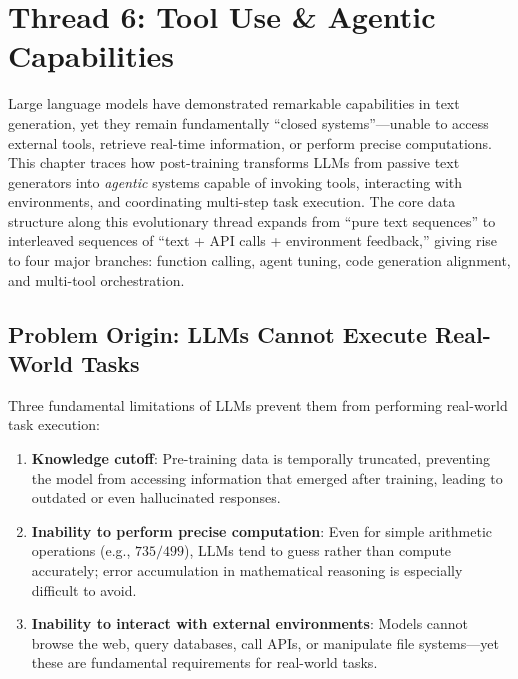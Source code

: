 
\section{Thread 6: Tool Use \& Agentic Capabilities}
\label{sec:t6}

Large language models have demonstrated remarkable capabilities in text generation, yet they remain fundamentally ``closed systems''---unable to access external tools, retrieve real-time information, or perform precise computations. This chapter traces how post-training transforms LLMs from passive text generators into \emph{agentic} systems capable of invoking tools, interacting with environments, and coordinating multi-step task execution. The core data structure along this evolutionary thread expands from ``pure text sequences'' to interleaved sequences of ``text + API calls + environment feedback,'' giving rise to four major branches: function calling, agent tuning, code generation alignment, and multi-tool orchestration.



\subsection{Problem Origin: LLMs Cannot Execute Real-World Tasks}
\label{sec:t6-origin}

\begin{problembox}
Three fundamental limitations of LLMs prevent them from performing real-world task execution:
\begin{enumerate}[leftmargin=*]
  \item \textbf{Knowledge cutoff}: Pre-training data is temporally truncated, preventing the model from accessing information that emerged after training, leading to outdated or even hallucinated responses.
  \item \textbf{Inability to perform precise computation}: Even for simple arithmetic operations (e.g., $735/499$), LLMs tend to guess rather than compute accurately; error accumulation in mathematical reasoning is especially difficult to avoid.
  \item \textbf{Inability to interact with external environments}: Models cannot browse the web, query databases, call APIs, or manipulate file systems---yet these are fundamental requirements for real-world tasks.
\end{enumerate}
\end{problembox}

